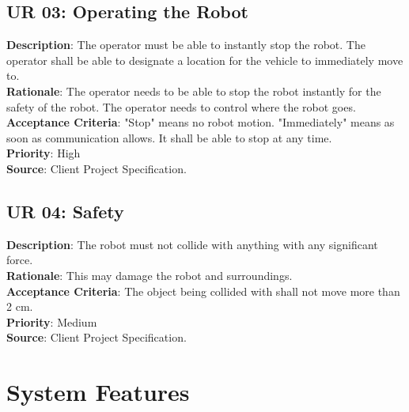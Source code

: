 \documentclass[12pt,a4paper]{article}
\begin{document}
    \subsection{UR 03: Operating the Robot}
    \textbf{Description}: The operator must be able to instantly stop the robot. The operator shall be able to designate a location for the vehicle to immediately move to.\\
    \textbf{Rationale}: The operator needs to be able to stop the robot instantly for the safety of the robot. The operator needs to control where the robot goes.\\
    \textbf{Acceptance Criteria}: "Stop" means no robot motion. "Immediately" means as soon as communication allows. It shall be able to stop at any time.\\
    \textbf{Priority}: High\\
    \textbf{Source}: Client Project Specification.\\
    
    \subsection{UR 04: Safety}
    \textbf{Description}: The robot must not collide with anything with any significant force.\\
    \textbf{Rationale}: This may damage the robot and surroundings.\\
    \textbf{Acceptance Criteria}: The object being collided with shall not move more than 2 cm.\\
    \textbf{Priority}: Medium\\
    \textbf{Source}: Client Project Specification.\\
    
    \newpage
    \section{System Features}
\end{document}
